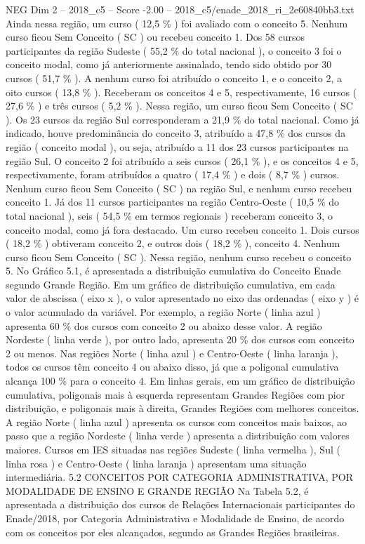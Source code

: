 \begin{textsample}{NEG Dim 2 – 2018\_c5 – Score -2.00 – 2018\_c5/enade\_2018\_ri\_2e60840bb3.txt}
Ainda nessa região, um curso ( 12,5 \% ) foi avaliado com o conceito 5.
Nenhum curso ficou Sem Conceito ( SC ) ou recebeu conceito 1.
Dos 58 cursos participantes da região Sudeste ( 55,2 \% do total nacional ), o conceito 3 foi o conceito modal, como já anteriormente assinalado, tendo sido obtido por 30 cursos ( 51,7 \% ).
A nenhum curso foi atribuído o conceito 1, e o conceito 2, a oito cursos ( 13,8 \% ).
Receberam os conceitos 4 e 5, respectivamente, 16 cursos ( 27,6 \% ) e três cursos ( 5,2 \% ).
Nessa região, um curso ficou Sem Conceito ( SC ).
Os 23 cursos da região Sul corresponderam a 21,9 \% do total nacional.
Como já indicado, houve predominância do conceito 3, atribuído a 47,8 \% dos cursos da região ( conceito modal ), ou seja, atribuído a 11 dos 23 cursos participantes na região Sul.
O conceito 2 foi atribuído a seis cursos ( 26,1 \% ), e os conceitos 4 e 5, respectivamente, foram atribuídos a quatro ( 17,4 \% ) e dois ( 8,7 \% ) cursos.
Nenhum curso ficou Sem Conceito ( SC ) na região Sul, e nenhum curso recebeu conceito 1.
Já dos 11 cursos participantes na região Centro-Oeste ( 10,5 \% do total nacional ), seis ( 54,5 \% em termos regionais ) receberam conceito 3, o conceito modal, como já fora destacado.
Um curso recebeu conceito 1.
Dois cursos ( 18,2 \% ) obtiveram conceito 2, e outros dois ( 18,2 \% ), conceito 4.
Nenhum curso ficou Sem Conceito ( SC ).
Nessa região, nenhum curso recebeu o conceito 5.
No Gráfico 5.1, é apresentada a distribuição cumulativa do Conceito Enade segundo Grande Região.
Em um gráfico de distribuição cumulativa, em cada valor de abscissa ( eixo x ), o valor apresentado no eixo das ordenadas ( eixo y ) é o valor acumulado da variável.
Por exemplo, a região Norte ( linha azul ) apresenta 60 \% dos cursos com conceito 2 ou abaixo desse valor.
A região Nordeste ( linha verde ), por outro lado, apresenta 20 \% dos cursos com conceito 2 ou menos.
Nas regiões Norte ( linha azul ) e Centro-Oeste ( linha laranja ), todos os cursos têm conceito 4 ou abaixo disso, já que a poligonal cumulativa alcança 100 \% para o conceito 4.
Em linhas gerais, em um gráfico de distribuição cumulativa, poligonais mais à esquerda representam Grandes Regiões com pior distribuição, e poligonais mais à direita, Grandes Regiões com melhores conceitos.
A região Norte ( linha azul ) apresenta os cursos com conceitos mais baixos, ao passo que a região Nordeste ( linha verde ) apresenta a distribuição com valores maiores.
Cursos em IES situadas nas regiões Sudeste ( linha vermelha ), Sul ( linha rosa ) e Centro-Oeste ( linha laranja ) apresentam uma situação intermediária. 5.2 CONCEITOS POR CATEGORIA ADMINISTRATIVA, POR MODALIDADE DE ENSINO E GRANDE REGIÃO Na Tabela 5.2, é apresentada a distribuição dos cursos de Relações Internacionais participantes do Enade/2018, por Categoria Administrativa e Modalidade de Ensino, de acordo com os conceitos por eles alcançados, segundo as Grandes Regiões brasileiras.

\end{textsample}
